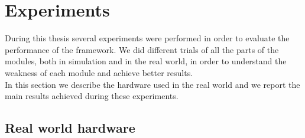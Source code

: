 \chapter{Experiments}\label{chap:experiments}
During this thesis several experiments were performed in order to evaluate the performance of the framework. We did different trials of all the parts of the modules, both in simulation and in the real world, in order to understand the weakness of each module and achieve better results.\\
In this section we describe the hardware used in the real world and we report the main results achieved during these experiments.\\

\section{Real world hardware}
